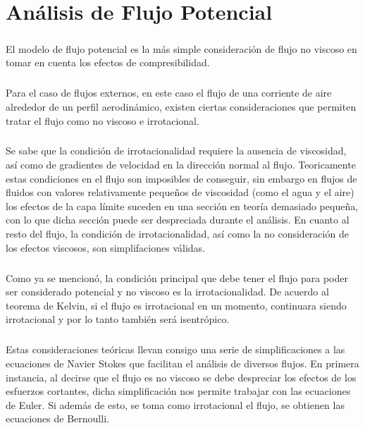 \documentclass[letterpaper, openright, 12pt]{book}
\begin{document}
%
%
%
%
%

\chapter{Análisis de Flujo Potencial}
    \paragraph*{}
        El modelo de flujo potencial es la más simple consideración de flujo no viscoso en
        tomar en cuenta los efectos de compresibilidad.

    \paragraph*{}
        Para el caso de flujos externos, en este caso el flujo de una corriente
        de aire alrededor de un perfil aerodinámico, existen ciertas
        consideraciones que permiten tratar el flujo como no viscoso e
        irrotacional.

    \paragraph*{}
        Se sabe que la condición de irrotacionalidad requiere la ausencia de
        viscosidad, así como de gradientes de velocidad en la dirección normal
        al flujo. Teoricamente estas condiciones en el flujo son imposibles de
        conseguir, sin embargo en flujos de fluidos con valores relativamente
        pequeños de viscosidad (como el agua y el aire) los efectos de la capa
        límite suceden en una sección en teoría demasiado pequeña, con lo  que
        dicha sección puede ser despreciada durante el análisis. En cuanto al
        resto del flujo, la condición de irrotacionalidad, así como la no
        consideración de los efectos viscosos, son simplifaciones válidas.

    \paragraph*{}
        Como ya se mencionó, la condición principal que debe tener el flujo
        para poder ser considerado potencial y no viscoso es la
        irrotacionalidad. De acuerdo al teorema de Kelvin, si el flujo es
        irrotacional en un momento, continuara siendo irrotacional y por lo
        tanto también será isentrópico.

    \paragraph*{}
        Estas consideraciones teóricas llevan consigo una serie de
        simplificaciones a las ecuaciones de Navier Stokes que facilitan el
        análisis de diversos flujos. En primera instancia, al decirse que el
        flujo es no viscoso se debe despreciar los efectos de los esfuerzos
        cortantes, dicha simplificación nos permite trabajar con las ecuaciones
        de Euler. Si además de esto, se toma como irrotacional el flujo, se
        obtienen las ecuaciones de Bernoulli.
\end{document}
